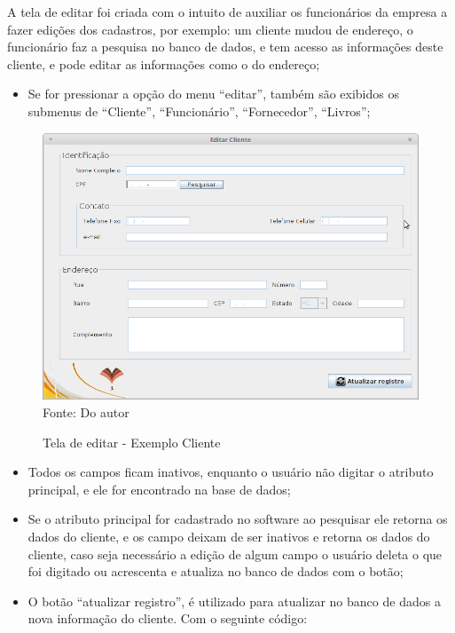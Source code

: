 A  tela de editar foi criada com o intuito de auxiliar os funcionários da empresa a fazer edições dos cadastros, por exemplo:
um cliente mudou de endereço, o funcionário faz a pesquisa no banco de dados, e tem acesso as informações deste cliente, e pode
editar as informações como o do endereço;

\begin{itemize}
 \item Se for pressionar a opção do menu “editar”, também são exibidos os submenus de “Cliente”, “Funcionário”, “Fornecedor”, “Livros”; 
\end{itemize}

\begin{figure}[H]
	\centering 
	\caption{Tela de editar - Exemplo Cliente}
	\label{editar_cliente}
	\includegraphics[scale = 0.6]{imagens/tela-editar-cliente.png}
	\\Fonte: Do autor
\end{figure}

\begin{itemize}
 \item Todos os campos ficam inativos, enquanto o usuário não digitar o atributo principal, e ele for encontrado na base de dados;

 \item Se o atributo principal for cadastrado no software ao pesquisar ele retorna os dados do cliente, e os campo deixam de ser inativos e retorna os dados do cliente, caso seja necessário a edição de algum campo o usuário deleta o que foi digitado ou acrescenta e atualiza no banco de dados com o botão;

 \item O botão “atualizar registro”, é utilizado para atualizar no banco de dados a nova informação do cliente. Com o seguinte código:
 \end{itemize}
 
